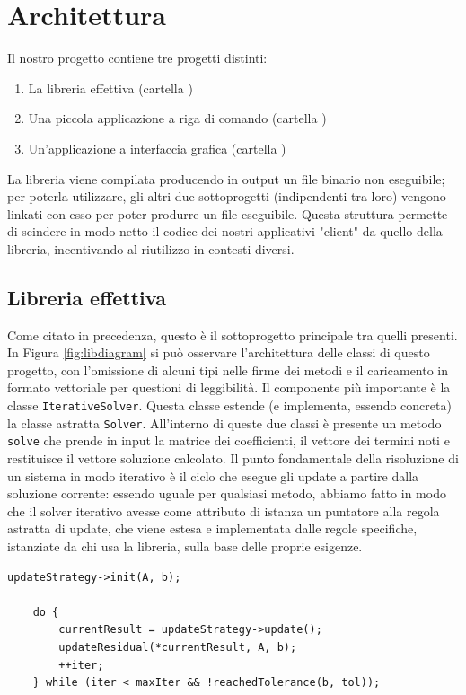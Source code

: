\section{Architettura}

Il nostro progetto contiene tre progetti distinti:

\begin{enumerate}
	\item La libreria effettiva (cartella )
	\item Una piccola applicazione a riga di comando (cartella )
	\item Un'applicazione a interfaccia grafica (cartella )
\end{enumerate}

La libreria viene compilata producendo in output un file binario non eseguibile; per poterla utilizzare, gli altri due sottoprogetti (indipendenti tra loro) vengono linkati con esso per poter produrre un file eseguibile. Questa struttura permette di scindere in modo netto il codice dei nostri applicativi "client" da quello della libreria, incentivando al riutilizzo in contesti diversi.

\subsection{Libreria effettiva}
Come citato in precedenza, questo è il sottoprogetto principale tra quelli presenti. In Figura \ref{fig:libdiagram} si può osservare l'architettura delle classi di questo progetto, con l'omissione di alcuni tipi nelle firme dei metodi e il caricamento in formato vettoriale per questioni di leggibilità. Il componente più importante è la classe \texttt{IterativeSolver}. Questa classe estende (e implementa, essendo concreta) la classe astratta \texttt{Solver}. All'interno di queste due classi  è presente un metodo \texttt{solve} che prende in input la matrice dei coefficienti, il vettore dei termini noti e restituisce il vettore soluzione calcolato. Il punto fondamentale della risoluzione di un sistema in modo iterativo è il ciclo che esegue gli update a partire dalla soluzione corrente: essendo uguale per qualsiasi metodo, abbiamo fatto in modo che il solver iterativo avesse come attributo di istanza un puntatore alla regola astratta di update,  che viene estesa e implementata dalle regole specifiche, istanziate da chi usa la libreria, sulla base delle proprie esigenze. 

\begin{lstlisting}[caption={Loop del solver}, label={lst:update}, float]
	updateStrategy->init(A, b);
	
	do {
		currentResult = updateStrategy->update();
		updateResidual(*currentResult, A, b);
		++iter;
	} while (iter < maxIter && !reachedTolerance(b, tol));
\end{lstlisting}

